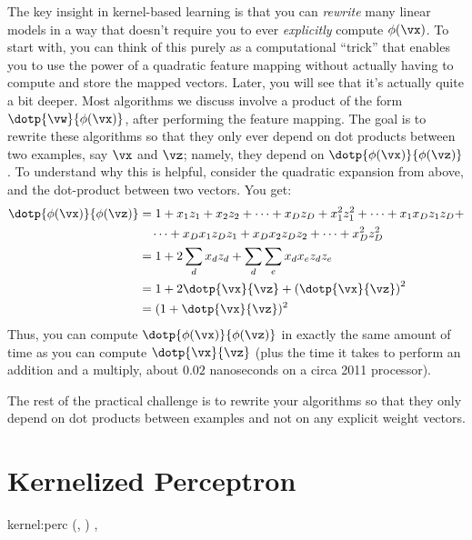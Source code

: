 The key insight in kernel-based learning is that you can
\emph{rewrite} many linear models in a way that doesn't require you to
ever \emph{explicitly} compute $\phi(\vx)$.  To start with, you can
think of this purely as a computational ``trick'' that enables you to
use the power of a quadratic feature mapping without actually having
to compute and store the mapped vectors.  Later, you will see that
it's actually quite a bit deeper.  Most algorithms we discuss involve
a product of the form $\dotp{\vw}{\phi(\vx)}$, after performing the
feature mapping.  The goal is to rewrite these algorithms so that they
only ever depend on dot products between two examples, say $\vx$ and
$\vz$; namely, they depend on $\dotp{\phi(\vx)}{\phi(\vz)}$.  To
understand why this is helpful, consider the quadratic expansion from
above, and the dot-product between two vectors.  You get:
%
\begin{align}
\dotp{\phi(\vx)}{\phi(\vz)}
&= 1 + x_1 z_1 + x_2 z_2 + \dots + x_D z_D + x_1^2 z_1^2 + \dots + x_1 x_D z_1 z_D + \nonumber\\
&\quad \dots + x_D x_1 z_D z_1 + x_D x_2 z_D z_2 + \dots + x_D^2 z_D^2 \\
&= 1 + 2 \sum_d x_d z_d + \sum_d \sum_e x_d x_e z_d z_e \\
&= 1 + 2 \dotp{\vx}{\vz} + \left(\dotp{\vx}{\vz}\right)^2\\
&= (1 + \dotp{\vx}{\vz})^2
\end{align}
%
Thus, you can compute $\dotp{\phi(\vx)}{\phi(\vz)}$ in exactly the
same amount of time as you can compute $\dotp{\vx}{\vz}$ (plus the
time it takes to perform an addition and a multiply, about $0.02$
nanoseconds on a circa 2011 processor).

The rest of the practical challenge is to rewrite your algorithms so
that they only depend on dot products between examples and not on any
explicit weight vectors.

\section{Kernelized Perceptron}

\newalgorithm%
  {kernel:perc}%
  {(, )}
  {
\ENDIF
\ENDFOR
\ENDFOR
\RETURN \VAR{$\vw$}, 
}

